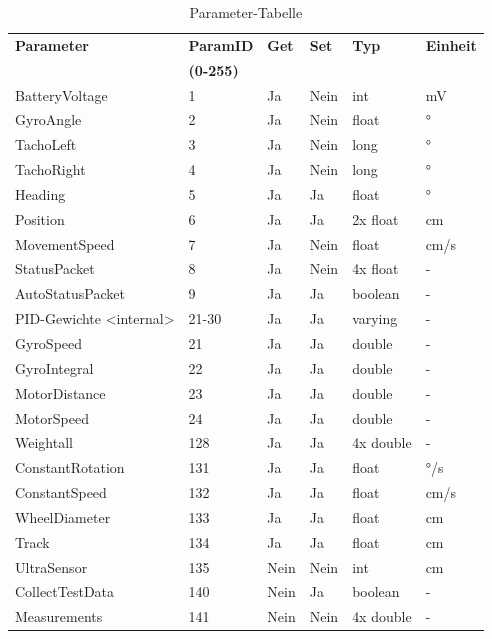 \documentclass[oneside,abstractoff,a4paper]{scrartcl}
\begin{document}
\begin{table}
	\caption{Parameter-Tabelle}
	\begin{tabular}{|l|l|l|l|l|l|}
		\hline
		\textbf{Parameter} & \textbf{ParamID} & \textbf{Get} & \textbf{Set} & \textbf{Typ} & \textbf{Einheit} \\
 		& \textbf{(0-255)} & & & & \\ 
		\hline
		BatteryVoltage & 1 & Ja & Nein & int & mV \\
		\hline
		GyroAngle & 2 & Ja & Nein & float & ° \\
		\hline
		TachoLeft & 3 & Ja & Nein & long & ° \\
		\hline
		TachoRight & 4 & Ja & Nein & long & ° \\
		\hline
		Heading & 5 & Ja & Ja & float & ° \\
		\hline
		Position & 6 & Ja & Ja & 2x float & cm \\
		\hline
		MovementSpeed & 7 & Ja & Nein & float & cm/s \\
		\hline
		StatusPacket & 8 & Ja & Nein & 4x float & - \\
		\hline
		AutoStatusPacket & 9 & Ja & Ja & boolean & - \\
		\hline
		PID-Gewichte <internal> & 21-30 & Ja & Ja & varying & - \\
		\hline
		\hline
		GyroSpeed & 21 & Ja & Ja & double & - \\
		\hline
		GyroIntegral & 22 & Ja & Ja & double & - \\
		\hline
		MotorDistance & 23 & Ja & Ja & double & - \\
		\hline
		MotorSpeed & 24 & Ja & Ja & double & - \\
		\hline
		Weightall & 128 & Ja & Ja & 4x double & - \\
		\hline
		ConstantRotation & 131 & Ja & Ja & float & °/s \\
		\hline
		ConstantSpeed & 132 & Ja & Ja & float & cm/s \\
		\hline
		WheelDiameter & 133 & Ja & Ja & float & cm \\
		\hline
		Track & 134 & Ja & Ja & float & cm \\
		\hline
		UltraSensor & 135 & Nein & Nein & int & cm \\
		\hline
		CollectTestData & 140 & Nein & Ja & boolean & - \\
		\hline
		Measurements & 141 & Nein & Nein & 4x double & - \\
		\hline
	\end{tabular}
	\label{tab:paramTable}
\end{table}
\end{document}
